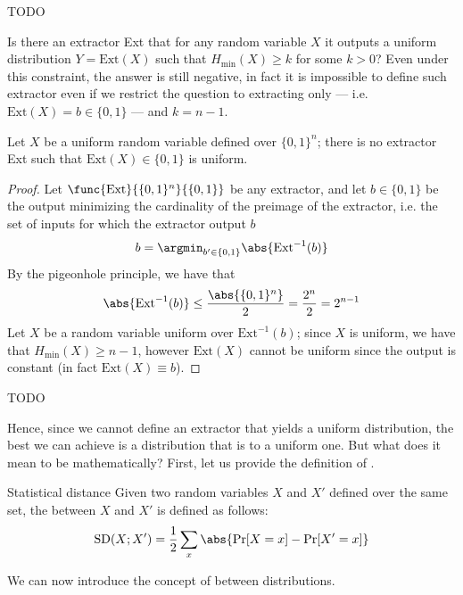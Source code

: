 \documentclass[a4paper, 12pt]{report}
\begin{document}
TODO 

Is there an extractor Ext that for any random variable $X$ it outputs a uniform distribution $Y = \mbox{Ext}(X)$ such that $H_\mathrm{min}(X) \ge k$ for some $k > 0$? Even under this constraint, the answer is still negative, in fact it is impossible to define such extractor even if we restrict the question to extracting only  --- i.e. $\mbox{Ext}(X) = b \in \{0, 1\}$ --- and $k = n - 1$.

\begin{framedprop}{}
	Let $X$ be a uniform random variable defined over $\{0, 1\}^n$; there is no extractor Ext such that $\mbox{Ext}(X) \in \{0, 1\}$ is uniform.
\end{framedprop}

\begin{proof}
	Let $\func{\mbox{Ext}}{\{0, 1\}^n}{\{0, 1\}}$ be any extractor, and let $b \in \{0, 1\}$ be the output minimizing the cardinality of the preimage of the extractor, i.e. the set of inputs for which the extractor output $b$ $$b = \argmin_{b' \in \{0, 1\}}{\abs{\mbox{Ext}^{-1}(b)}}$$ By the pigeonhole principle, we have that $$\abs{\mbox{Ext}^{-1}(b)} \le \dfrac{\abs{\{0, 1\}^n}}{2} = \dfrac{2^n}{2} = 2^{n - 1}$$ Let $X$ be a random variable uniform over $\mbox{Ext}^{-1}(b)$; since $X$ is uniform, we have that $H_\mathrm{min}(X) \ge n- 1$, however $\mbox{Ext}(X)$ cannot be uniform since the output is constant (in fact $\mbox{Ext}(X) \equiv b$).
\end{proof}


TODO 

Hence, since we cannot define an extractor that yields a uniform distribution, the best we can achieve is a distribution that is  to a uniform one. But what does it mean to be  mathematically? First, let us provide the definition of .

\begin{frameddefn}{Statistical distance}
	Given two random variables $X$ and $X'$ defined over the same set, the  between $X$ and $X'$ is defined as follows: $$\mbox{SD}(X; X') = \dfrac{1}{2} \sum_x{\abs{\Pr[X = x] - \Pr[X' = x]}}$$
\end{frameddefn}

We can now introduce the concept of  between distributions.
\end{document}
